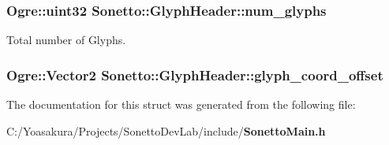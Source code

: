 \subsubsection{\setlength{\rightskip}{0pt plus 5cm}Ogre::uint32 {\bf Sonetto::GlyphHeader::num\_\-glyphs}}\label{struct_sonetto_1_1_glyph_header_e2561d3738cbe7e68e96a25f241eeeff}


Total number of Glyphs. 

\subsubsection{\setlength{\rightskip}{0pt plus 5cm}Ogre::Vector2 {\bf Sonetto::GlyphHeader::glyph\_\-coord\_\-offset}}\label{struct_sonetto_1_1_glyph_header_6a810572ebf311bb7c7ca3e82bf349ee}




The documentation for this struct was generated from the following file:\begin{CompactItemize}
\item 
C:/Yoasakura/Projects/SonettoDevLab/include/{\bf SonettoMain.h}\end{CompactItemize}
